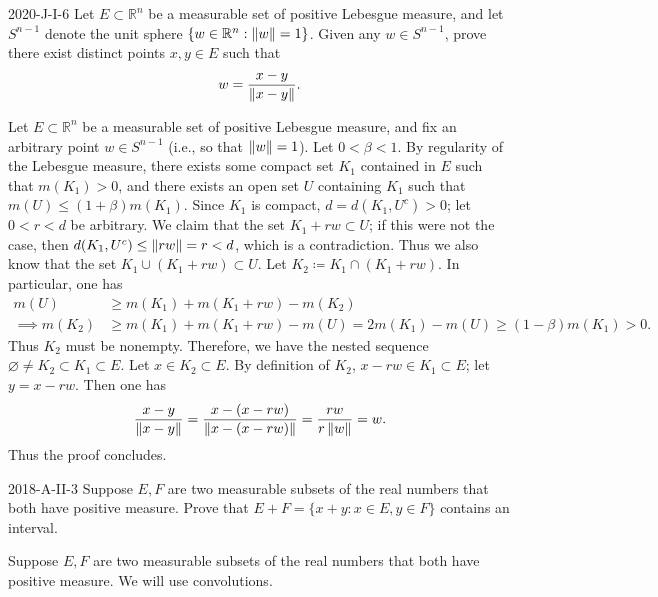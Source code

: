 \documentclass{article}
\begin{document}
		\begin{prb}{2020-J-I-6}
			Let $E \subset \mathbb{R}^n$ be a measurable set of positive Lebesgue measure, and let $S^{n-1}$ denote the unit sphere $\{w \in \mathbb{R}^n: \left\Vert w \right\Vert = 1\}$. Given any $w \in S^{n-1}$, prove there exist distinct points $x, y \in E$ such that 
			\begin{equation*}
				w = \frac{x - y}{\left\Vert x - y \right\Vert}. 
			\end{equation*}
		\end{prb}
		Let $E \subset \mathbb{R}^n$ be a measurable set of positive Lebesgue measure, and fix an arbitrary point $w \in S^{n-1}$ (i.e., so that $\left\Vert w \right\Vert = 1$). Let $0 < \beta < 1$. By regularity of the Lebesgue measure, there exists some compact set $K_{1}$ contained in $E$ such that $m(K_1) > 0$, and there exists an open set $U$ containing $K_1$ such that $m(U) \leq (1 + \beta)m(K_1)$. Since $K_1$ is compact, $d = d(K_1, U^c) > 0$; let $0 < r < d$ be arbitrary. We claim that the set $K_1 + rw \subset U$; if this were not the case, then $d(K_1, U^c) \leq \left\Vert rw \right\Vert = r < d$, which is a contradiction. Thus we also know that the set $K_1 \cup (K_1 + rw) \subset U$. Let $K_{2} \coloneqq K_1 \cap (K_1 + rw)$. In particular, one has 
		\begin{align*}
			m(U) &\geq m(K_1) + m(K_1 + rw) - m(K_2) \\
			\implies 
			m(K_2) &\geq m(K_1) + m(K_1 + rw) - m(U) = 2m(K_1) -m(U) \geq (1 - \beta)m(K_1) > 0. 
		\end{align*}
		Thus $K_2$ must be nonempty. Therefore, we have the nested sequence $\varnothing \neq K_2 \subset K_1 \subset E$. Let $x \in K_2 \subset E$. By definition of $K_2$, $x -rw \in K_1 \subset E$; let $y = x - rw$. Then one has 
		\begin{equation*}
			\frac{x - y}{\left\Vert x - y \right\Vert} = \frac{x - (x - rw)}{\left\Vert x - (x - rw) \right\Vert} = \frac{rw}{r\left\Vert w \right\Vert} = w. 
		\end{equation*} 
		Thus the proof concludes. 
		
		\begin{prb}{2018-A-II-3}
			Suppose $E, F$ are two measurable subsets of the real numbers that both have positive measure. Prove that $E + F = \{x + y: x \in E, y \in F\}$ contains an interval. 
		\end{prb}
		
		Suppose $E, F$ are two measurable subsets of the real numbers that both have positive measure. We will use convolutions.
		
\end{document}
